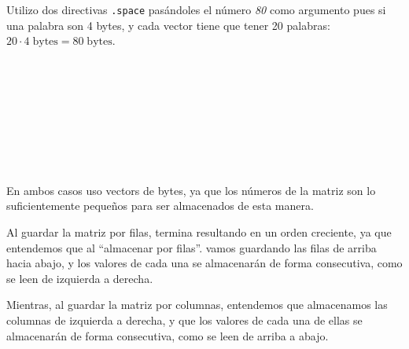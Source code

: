 \documentclass[a4paper]{report}
\begin{document}
\section{}

\inputminted[linenos]{mips}{src/problemas/2.asm}

Utilizo dos directivas \texttt{.space} pasándoles el número \textit{80} como argumento pues si una palabra son 4 bytes, y cada vector tiene que tener 20 palabras: $20 \cdot 4\;\text{bytes} = 80\;\text{bytes}$.

\section{}

\inputminted[linenos]{mips}{src/problemas/3.asm}


\section{}

\inputminted[linenos]{mips}{src/problemas/4.asm}


\section{}

\inputminted[linenos, breaklines, breakbytokenanywhere]{mips}{src/problemas/5.asm}


\section{}

\inputminted[linenos]{mips}{src/problemas/6.asm}

En ambos casos uso vectors de bytes, ya que los números de la matriz son lo suficientemente pequeños para ser almacenados de esta manera.

Al guardar la matriz por filas, termina resultando en un orden creciente, ya que entendemos que al ``almacenar por filas''. vamos guardando las filas de arriba hacia abajo, y los valores de cada una se almacenarán de forma consecutiva, como se leen de izquierda a derecha.

Mientras, al guardar la matriz por columnas, entendemos que almacenamos las columnas de izquierda a derecha, y que los valores de cada una de ellas se almacenarán de forma consecutiva, como se leen de arriba a abajo.
\end{document}
